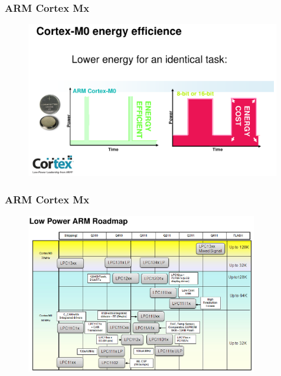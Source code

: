 \documentclass{beamer}
\begin{document}
\begin{frame} 
\frametitle{ARM Cortex Mx}
\begin{figure}[h] \begin{center}
\includegraphics[width=0.99\textwidth]{figures/arm-cortex4.png}
\end{center} \end{figure}
\end{frame}

\begin{frame} 
\frametitle{ARM Cortex Mx}
\begin{figure}[h] \begin{center}
\includegraphics[width=0.9\textwidth]{figures/arm-lowproad.png}
\end{center} \end{figure}
\end{frame}
\end{document}
